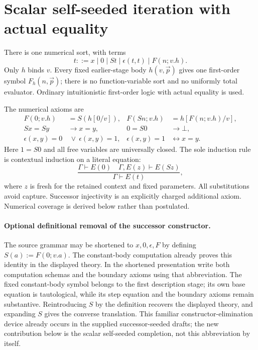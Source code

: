 \section{Scalar self-seeded iteration with actual equality}
\label{sec:selfseed-theory}
There is one numerical sort, with terms
\[
 t ::= x\mid 0\mid St\mid \epsilon(t,t)\mid F(n;v.h).
\]
Only $h$ binds $v$. Every fixed earlier-stage body $h(v,\vec p)$ gives
one first-order symbol $F_h(n,\vec p)$; there is no function-variable
sort and no uniformly total evaluator. Ordinary intuitionistic
first-order logic with actual equality is used.

The numerical axioms are
\begin{align*}
F(0;v.h)&=S(h[0/v]),&F(Sn;v.h)&=h[F(n;v.h)/v],\\
Sx=Sy&\longrightarrow x=y,&0=S0&\longrightarrow\bot,\\
\epsilon(x,y)=0&\ \lor\ \epsilon(x,y)=1,&
\epsilon(x,y)=1&\longleftrightarrow x=y.
\end{align*}
Here $1=S0$ and all free variables are universally closed.
The sole induction rule is contextual induction on a literal equation:
\[
\frac{\Gamma\vdash E(0)\quad\Gamma,E(z)\vdash E(Sz)}
     {\Gamma\vdash E(t)},
\]
where $z$ is fresh for the retained context and fixed parameters.
All substitutions avoid capture. Successor injectivity is an explicitly
charged additional axiom. Numerical coverage is derived below rather
than postulated.

\paragraph{Optional definitional removal of the successor constructor.}
The source grammar may be shortened to $x,0,\epsilon,F$ by defining
$S(a):=F(0;v.a)$. The constant-body computation already proves this
identity in the displayed theory. In the shortened presentation write
both computation schemas and the boundary axioms using that abbreviation.
The fixed constant-body symbol belongs to the first description stage;
its own base equation is tautological, while its step equation and the
boundary axioms remain substantive. Reintroducing $S$ by the definition
recovers the displayed theory, and expanding $S$ gives the converse
translation. This familiar constructor-elimination device already occurs
in the supplied successor-seeded drafts; the new contribution below is
the scalar self-seeded completion, not this abbreviation by itself.

